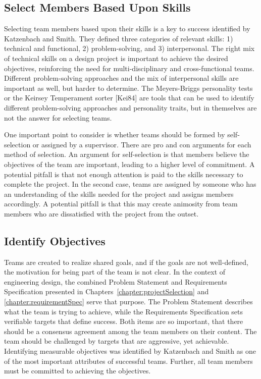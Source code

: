 \subsection{Select Members Based Upon Skills}
\label{subsetion:select-members-based-upon-skills}

Selecting team members based upon their skills is a key to success
identified by Katzenbach and Smith. They defined three categories of
relevant skills: 1) technical and functional, 2) problem-solving, and 3)
interpersonal. The right mix of technical skills on a design project is
important to achieve the desired objectives, reinforcing the need for
multi-disciplinary and cross-functional teams. Different problem-solving
approaches and the mix of interpersonal skills are important as well,
but harder to determine. The Meyers-Briggs personality tests or the
Keirsey Temperament sorter {[}Kei84{]} are tools that can be used to
identify different problem-solving approaches and personality traits,
but in themselves are not the answer for selecting teams.

One important point to consider is whether teams should be formed by
self-selection or assigned by a supervisor. There are pro and con
arguments for each method of selection. An argument for self-selection
is that members believe the objectives of the team are important,
leading to a higher level of commitment. A potential pitfall is that not
enough attention is paid to the skills necessary to complete the
project. In the second case, teams are assigned by someone who has an
understanding of the skills needed for the project and assigns members
accordingly. A potential pitfall is that this may create animosity from
team members who are dissatisfied with the project from the outset.

\subsection{Identify Objectives}
\label{subsection:identify-objectives}

Teams are created to realize shared goals, and if the goals are not
well-defined, the motivation for being part of the team is not clear. In
the context of engineering design, the combined Problem Statement and
Requirements Specification presented in 
Chapters~\ref{chapter:projectSelection} and \ref{chapter:requirementSpec} 
serve that
purpose. The Problem Statement describes what the team is trying to
achieve, while the Requirements Specification sets verifiable targets
that define success. Both items are so important, that there should be a
consensus agreement among the team members on their content. The team
should be challenged by targets that are aggressive, yet achievable.
Identifying measurable objectives was identified by Katzenbach and Smith
as one of the most important attributes of successful teams. Further,
all team members must be committed to achieving the objectives.

